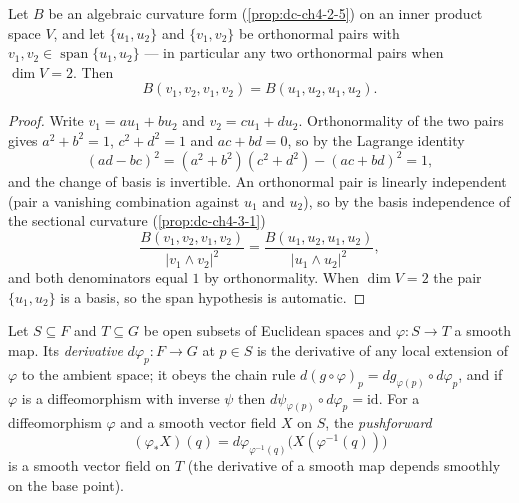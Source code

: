 \begin{lemma}
  \label{lem:dc-ch6-2-7-plane}
  \leanok
  Let $B$ be an algebraic curvature form (\cref{prop:dc-ch4-2-5}) on an inner
  product space $V$, and let $\{u_1,u_2\}$ and $\{v_1,v_2\}$ be orthonormal
  pairs with $v_1,v_2\in\operatorname{span}\{u_1,u_2\}$ — in particular any two
  orthonormal pairs when $\dim V=2$. Then
  $$
  B(v_1,v_2,v_1,v_2)=B(u_1,u_2,u_1,u_2).
  $$
\end{lemma}
\begin{proof}
  \leanok
  \sketch
  Write $v_1=au_1+bu_2$ and $v_2=cu_1+du_2$. Orthonormality of the two pairs
  gives $a^2+b^2=1$, $c^2+d^2=1$ and $ac+bd=0$, so by the Lagrange identity
  $$
  (ad-bc)^2=(a^2+b^2)(c^2+d^2)-(ac+bd)^2=1,
  $$
  and the change of basis is invertible. An orthonormal pair is linearly
  independent (pair a vanishing combination against $u_1$ and $u_2$), so by
  the basis independence of the sectional curvature (\cref{prop:dc-ch4-3-1})
  $$
  \frac{B(v_1,v_2,v_1,v_2)}{|v_1\wedge v_2|^2}
    =\frac{B(u_1,u_2,u_1,u_2)}{|u_1\wedge u_2|^2},
  $$
  and both denominators equal $1$ by orthonormality. When $\dim V=2$ the pair
  $\{u_1,u_2\}$ is a basis, so the span hypothesis is automatic.
\end{proof}

\begin{definition}
  \label{def:dc-ch6-2-7-pushforward}
  \leanok
  Let $S\subseteq F$ and $T\subseteq G$ be open subsets of Euclidean spaces and
  $\varphi:S\to T$ a smooth map. Its \emph{derivative} $d\varphi_p:F\to G$ at
  $p\in S$ is the derivative of any local extension of $\varphi$ to the
  ambient space; it obeys the chain rule
  $d(g\circ\varphi)_p=dg_{\varphi(p)}\circ d\varphi_p$, and if $\varphi$ is a
  diffeomorphism with inverse $\psi$ then
  $d\psi_{\varphi(p)}\circ d\varphi_p=\mathrm{id}$. For a diffeomorphism
  $\varphi$ and a smooth vector field $X$ on $S$, the \emph{pushforward}
  $$
  (\varphi_*X)(q)=d\varphi_{\varphi^{-1}(q)}\bigl(X(\varphi^{-1}(q))\bigr)
  $$
  is a smooth vector field on $T$ (the derivative of a smooth map depends
  smoothly on the base point).
\end{definition}

